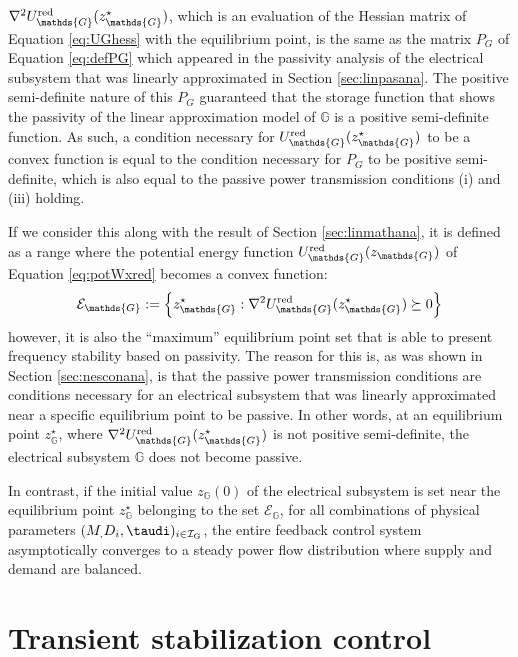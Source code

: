 \documentclass[graybox, envcountchap]{svmult}
\begin{document}
$\nabla^2 U_{\mathds{G}}^{\rm red} (z_{\mathds{G}}^{\star})$, which is an evaluation of the Hessian matrix of Equation \ref{eq:UGhess} with the equilibrium point, is the same as the matrix $P_G$ of Equation \ref{eq:defPG} which appeared in the passivity analysis of the electrical subsystem that was linearly approximated in Section \ref{sec:linpasana}.
The positive semi-definite nature of this $P_G$ guaranteed that the storage function that shows the passivity of the linear approximation model of $\mathds{G}$ is a positive semi-definite function.
As such, a condition necessary for $U_{\mathds{G}}^{\rm red} (z_{\mathds{G}}^{\star})$ to be a convex function is equal to the condition necessary for $P_G$ to be positive semi-definite, which is also equal to the passive power transmission conditions (i) and (iii) holding.

If we consider this along with the result of Section \ref{sec:linmathana}, it is defined as a range where the potential energy function $U_{\mathds{G}}^{\rm red} (z_{\mathds{G}})$ of Equation \ref{eq:potWxred} becomes a convex function:
\[
\mathcal{E}_{\mathds{G}}:=
\left\{
z_{\mathds{G}}^{\star} : \nabla^2 U_{\mathds{G}}^{\rm red} (z_{\mathds{G}}^{\star}) 
\succeq 0
\right\}
\]
however, it is also the “maximum” equilibrium point set that is able to present frequency stability based on passivity.
The reason for this is, as was shown in Section \ref{sec:nesconana}, is that the passive power transmission conditions are conditions necessary for an electrical subsystem that was linearly approximated near a specific equilibrium point to be passive.
In other words, at an equilibrium point $z_{\mathds{G}}^{\star}$, where $\nabla^2 U_{\mathds{G}}^{\rm red} (z_{\mathds{G}}^{\star}) $ is not positive semi-definite, the electrical subsystem $\mathds{G}$ does not become passive.

In contrast, if the initial value $z_{\mathds{G}}(0)$ of the electrical subsystem is set near the equilibrium point $z_{\mathds{G}}^{\star}$ belonging to the set $\mathcal{E}_{\mathds{G}}$,
for all combinations of physical parameters $(M_,D_i,\taudi)_{i \in \mathcal{I}_{\rm G}}$,
the entire feedback control system asymptotically converges to a steady power flow distribution where supply and demand are balanced.

\section{Transient stabilization control}\label{sec:transcont}
\end{document}
